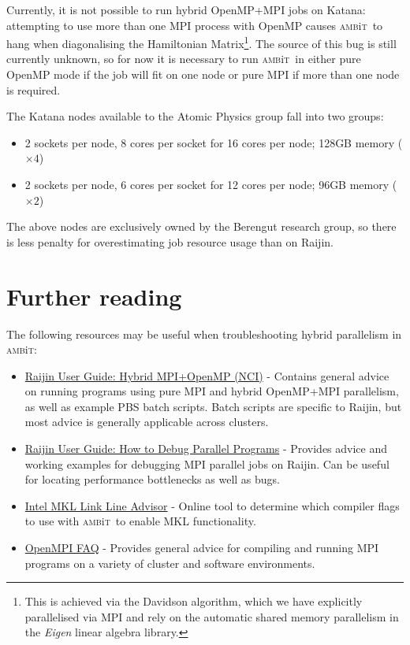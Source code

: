 \documentclass{report}
\newcommand{\ambit}{\textsc{amb}{\footnotesize i}\textsc{t}}
\begin{document}
Currently, it is not possible to run hybrid OpenMP+MPI jobs on Katana: attempting to use more than one
MPI process with OpenMP causes \ambit\ to hang when diagonalising the Hamiltonian Matrix\footnote{This is
achieved via the Davidson algorithm, which we have explicitly parallelised via MPI and rely on the
automatic shared memory parallelism in the \textit{Eigen} linear algebra library.}. The source of this
bug is still currently unknown, so for now it is necessary to run \ambit\ in either pure OpenMP mode if
the job will fit on one node or pure MPI if more than one node is required.

The Katana nodes available to the Atomic Physics group fall into two groups:

\begin{itemize}
\item 2 sockets per node, 8 cores per socket for 16 cores per node; 128GB memory ($\times 4$)
\item 2 sockets per node, 6 cores per socket for 12 cores per node; 96GB memory ($\times 2$)
\end{itemize}

The above nodes are exclusively owned by the Berengut research group, so there is less penalty for
overestimating job resource usage than on Raijin.

\section{Further reading}

The following resources may be useful when troubleshooting hybrid parallelism in \ambit:
\begin{itemize}
\item \href{https://opus.nci.org.au/display/Help/Hybrid+MPI+OpenMP}{Raijin User Guide: Hybrid MPI+OpenMP
(NCI)} - Contains general advice on running programs using pure MPI and hybrid OpenMP+MPI parallelism, 
as well as example PBS batch scripts. Batch scripts are specific to Raijin, but most advice is generally
applicable across clusters.

\item \href{https://opus.nci.org.au/display/Help/How+to+Debug+Parallel+Programs}{Raijin User Guide: How
to Debug Parallel Programs} - Provides advice and working examples for debugging MPI parallel jobs on
Raijin. Can be useful for locating performance bottlenecks as well as bugs.

\item \href{https://software.intel.com/en-us/articles/intel-mkl-link-line-advisor/}{Intel MKL Link Line
Advisor} - Online tool to determine which compiler flags to use with \ambit\ to enable MKL functionality.

\item \href{https://www.open-mpi.org/faq/}{OpenMPI FAQ} - Provides general advice for compiling and
running MPI programs on a variety of cluster and software environments.
\end{itemize}
\end{document}
